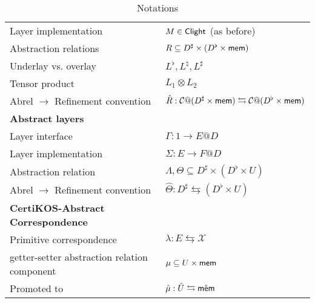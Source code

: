 \documentclass[acmsmall,review,anonymous]{acmart}\settopmatter{printfolios=true,printccs=false,printacmref=false}
\begin{document}
\begin{table}
\begin{tabular}{ll}
    Layer implementation & $M \in  \mathsf{Clight} $ (as before) \\
    Abstraction relations & $R \subseteq D^\sharp \times (D^\flat \times  \mathsf{mem} )$ \\
    Underlay vs. overlay & $L^\flat, L^\natural, L^\sharp$ \\
    Tensor product & $L_1 \otimes L_2$ \\
    Abrel $\rightarrow$ Refinement convention &
      $\hat{R} : \mathcal{C}@(D^\sharp \times  \mathsf{mem} ) \leftrightarrows
             \mathcal{C}@(D^\flat  \times  \mathsf{mem} )$ \\
    \hline
    \textbf{Abstract layers} \\
    Layer interface & $\Gamma : 1 \rightarrow E@D$ \\
    Layer implementation & $\Sigma : E \rightarrow F@D$ \\
    Abstraction relation & $\Lambda, \Theta \subseteq D^\sharp \times (D^\flat \times U)$ \\
    Abrel $\rightarrow$ Refinement convention &
      $\hat{\Theta} : D^\sharp \leftrightarrows
             (D^\flat  \times U)$ \\
    \hline
    \textbf{CertiKOS-Abstract Correspondence} \\
    Primitive correspondence & $\lambda : E \leftrightarrows \mathcal{X}$ \\
    getter-setter abstraction relation component &
      $\mu \subseteq U \times  \mathsf{mem}  $ \\
    Promoted to & $\hat{\mu} : \hat{U} \leftrightarrows \hat{ \mathsf{mem} }$ \\
    \hline
  \end{tabular}
  \\
  \caption{Notations}
\end{table}
\end{document}
